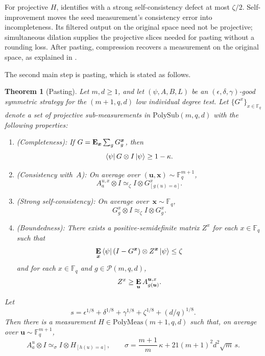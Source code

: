 \documentclass[11pt]{article}
\newtheorem{theorem}{Theorem}[section]
\theoremstyle{definition}
\newcommand{\E}{\mathop{\bf E\/}}
\newcommand{\F}{\mathbb F}
\newcommand{\eps}{\epsilon}
\newcommand{\calP}{\mathcal{P}}
\newcommand{\bu}{\boldsymbol{u}}
\newcommand{\bx}{{\boldsymbol{x}}}
\newcommand{\polyfunc}[3]{\calP(#1, #2, #3)}
\newcommand{\polymeas}[3]{\mathrm{PolyMeas}(#1, #2, #3)}
\newcommand{\polysub}[3]{\mathrm{PolySub}(#1, #2, #3)}
\begin{document}
For projective $H$,  identifies
 with a strong self-consistency defect at
most $\zeta/2$.  Self-improvement moves the seed measurement's
consistency error into incompleteness.  Its filtered output on the
original space need not be projective; simultaneous dilation supplies
the projective slices needed for pasting without a rounding loss.
After pasting, compression recovers a measurement on the original
space, as explained in .

The second main step is pasting, which is stated as follows.

\begin{theorem}[Pasting]\label{thm:ld-pasting-in-induction-section}
  Let $m,d\geq1$, and let $(\psi, A, B, L)$ be an
  $(\eps, \delta, \gamma)$-good symmetric strategy for the
  $(m+1,q,d)$ low individual degree test.
  Let $\{G^x\}_{x \in \F_q}$ denote a set of projective sub-measurements in $\polysub{m}{q}{d}$ with the following properties:
  \begin{enumerate}
  \item (Completeness): \label{item:ld-pasting-inductive-completeness}  If $G = \E_{\bx} \sum_g G^{\bx}_g$, then
	\begin{equation*}
	\bra{\psi} G \otimes I \ket{\psi} \geq 1 - \kappa.
	\end{equation*}
  \item (Consistency with~$A$): \label{item:ld-pasting-inductive-consistency} On average over $(\bu, \bx) \sim \F_q^{m+1}$,
	  \begin{equation*}
	  A^{u, x}_a \otimes I \simeq_{\zeta} I \otimes G^x_{[g(u)=a]}.
	  \end{equation*}
  \item (Strong self-consistency): \label{item:ld-pasting-inductive-self-consistency} On average over~$\bx \sim \F_q$,
	\begin{equation*}
		G^x_g \otimes I \approx_{\zeta} I \otimes G^x_g.
	\end{equation*}
  \item (Boundedness): \label{item:ld-pasting-inductive-boundedness} There exists a positive-semidefinite matrix $Z^x$ for each $x \in \F_q$ such that
	\begin{equation*}
		\E_{\bx} \bra{\psi} (I-G^{\bx})\otimes Z^{\bx} \ket{\psi} \leq \zeta
	\end{equation*}
	and for each $x \in \F_q$ and $g \in \polyfunc{m}{q}{d}$,
	\begin{equation*}
	Z^x \geq \E_{\bu} A^{\bu, x}_{g(\bu)}.
	\end{equation*}
  \end{enumerate}
Let
\[
 s=\eps^{1/8}+\delta^{1/8}+\gamma^{1/8}
   +\zeta^{1/8}+(d/q)^{1/8}.
\]
Then there is a measurement $H\in\polymeas{m+1}{q}{d}$ such that,
on average over $\bu\sim\F_q^{m+1}$,
\begin{equation*}
 A^u_a\otimes I\simeq_{\sigma}I\otimes H_{[h(u)=a]},
 \qquad
 \sigma=\frac{m+1}{m}\,\kappa
       +21(m+1)^2d^2\sqrt{m}\,s.
\end{equation*}
\end{theorem}
\end{document}
